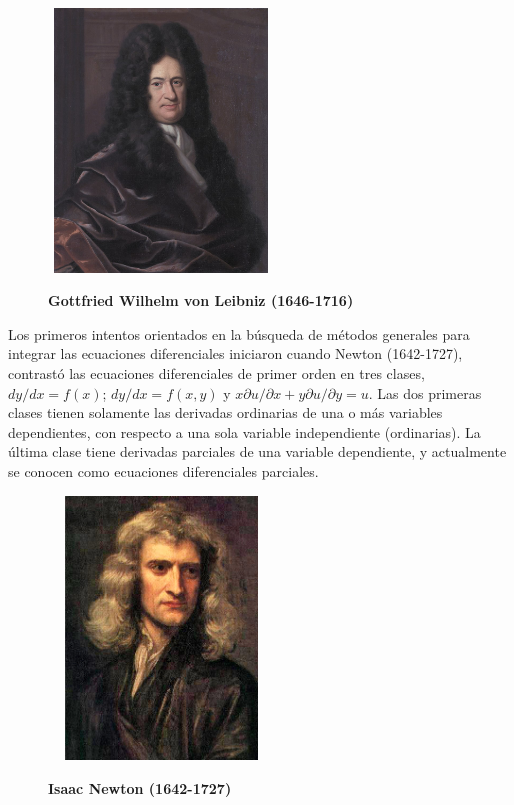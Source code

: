 \documentclass[12pt,a4paper,oneside]{book}
\begin{document}
		\begin{figure}[h]
		\centering
		\includegraphics[width=6cm, height=7cm]{Figura_de_Leibniz.jpg}
		\begin{center}
			\textbf{Gottfried Wilhelm von Leibniz (1646-1716)}
		\end{center}
	\end{figure}
	
	\newpage
	\noindent
	Los primeros intentos orientados en la búsqueda de métodos generales para integrar las ecuaciones diferenciales iniciaron cuando Newton (1642-1727), contrastó las ecuaciones diferenciales de
	primer orden en tres clases, $dy/dx=f(x)$; $dy/dx=f(x ,y)$ y $x\partial u/\partial x + y\partial u/\partial y=u$.
	Las dos primeras clases tienen solamente las derivadas ordinarias de una o más variables dependientes, con respecto a una sola variable independiente (ordinarias). La última clase tiene derivadas parciales de una variable dependiente, y actualmente se conocen como ecuaciones diferenciales parciales.
	
	\begin{figure}[h]
		\centering
		\includegraphics[width=6cm, height=7cm]{Figura_de_Newton.jpg}
		\begin{center}
			\textbf{Isaac Newton (1642-1727)}
		\end{center}
	\end{figure}
	
\end{document}

